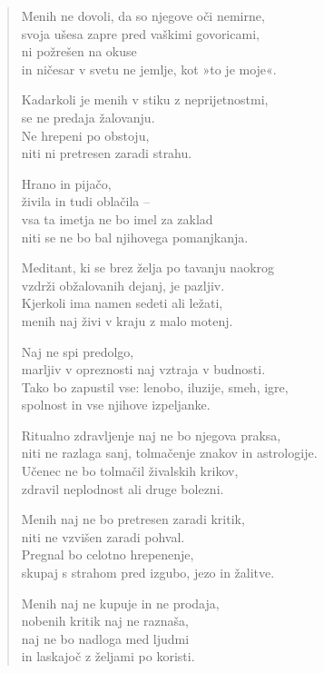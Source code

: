 \begin{verse}
Menih ne dovoli, da so njegove oči nemirne,\\
svoja ušesa zapre pred vaškimi govoricami,\\
ni požrešen na okuse\\
in ničesar v svetu ne jemlje, kot »to je moje«.

Kadarkoli je menih v stiku z neprijetnostmi,\\
se ne predaja žalovanju.\\
Ne hrepeni po obstoju,\\
niti ni pretresen zaradi strahu.

Hrano in pijačo,\\
živila in tudi oblačila --\\
vsa ta imetja ne bo imel za zaklad\\
niti se ne bo bal njihovega pomanjkanja.

Meditant, ki se brez želja po tavanju naokrog\\
vzdrži obžalovanih dejanj, je pazljiv.\\
Kjerkoli ima namen sedeti ali ležati,\\
menih naj živi v kraju z malo motenj.

Naj ne spi predolgo,\\
marljiv v opreznosti naj vztraja v budnosti.\\
Tako bo zapustil vse: lenobo, iluzije, smeh, igre,\\
spolnost in vse njihove izpeljanke.

Ritualno zdravljenje naj ne bo njegova praksa,\\
niti ne razlaga sanj, tolmačenje znakov in astrologije.\\
Učenec ne bo tolmačil živalskih krikov,\\
zdravil neplodnost ali druge bolezni.

Menih naj ne bo pretresen zaradi kritik,\\
niti ne vzvišen zaradi pohval.\\
Pregnal bo celotno hrepenenje,\\
skupaj s strahom pred izgubo, jezo in žalitve.

Menih naj ne kupuje in ne prodaja,\\
nobenih kritik naj ne raznaša,\\
naj ne bo nadloga med ljudmi\\
in laskajoč z željami po koristi.


\end{verse}
